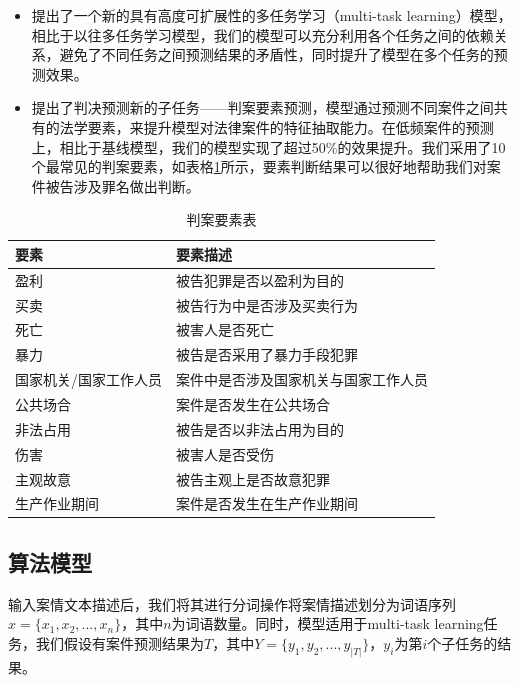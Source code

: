 \begin{itemize}
	\item 提出了一个新的具有高度可扩展性的多任务学习（multi-task learning）模型，相比于以往多任务学习模型，我们的模型可以充分利用各个任务之间的依赖关系，避免了不同任务之间预测结果的矛盾性，同时提升了模型在多个任务的预测效果。
	\item 提出了判决预测新的子任务——判案要素预测，模型通过预测不同案件之间共有的法学要素，来提升模型对法律案件的特征抽取能力。在低频案件的预测上，相比于基线模型，我们的模型实现了超过50\%的效果提升。我们采用了10个最常见的判案要素，如表格\ref{tab:key_elements}所示，要素判断结果可以很好地帮助我们对案件被告涉及罪名做出判断。
	\end{itemize}

\begin{table}[]
\center
\begin{tabular}{l|l}
\hline
\textbf{要素}          & \textbf{要素描述}   \\ \hline
盈利          & 被告犯罪是否以盈利为目的       \\
买卖          & 被告行为中是否涉及买卖行为      \\
死亡          & 被害人是否死亡            \\
暴力          & 被告是否采用了暴力手段犯罪      \\
国家机关/国家工作人员 & 案件中是否涉及国家机关与国家工作人员 \\
公共场合        & 案件是否发生在公共场合        \\
非法占用        & 被告是否以非法占用为目的       \\
伤害          & 被害人是否受伤            \\
主观故意        & 被告主观上是否故意犯罪        \\
生产作业期间      & 案件是否发生在生产作业期间  \\ \hline   
\end{tabular}
\label{tab:key_elements}
\caption{判案要素表}
\end{table}


\subsection{算法模型}
输入案情文本描述后，我们将其进行分词操作将案情描述划分为词语序列$x = \{x_{1}, x_{2}, ..., x_{n}\}$，其中$n$为词语数量。同时，模型适用于multi-task learning任务，我们假设有案件预测结果为$T$，其中$Y = \{y_{1}, y_{2}, ..., y_{|T|}\}$，$y_{i}$为第$i$个子任务的结果。

